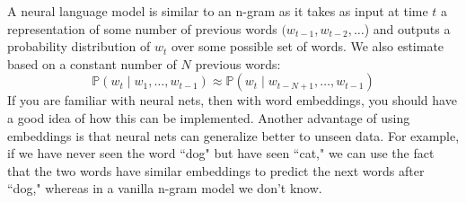 \documentclass{article}
\begin{document}
    A neural language model is similar to an n-gram as it takes as input at time $t$ a representation of some number of previous words $(w_{t-1}, w_{t-2}, \ldots$) and outputs a probability distribution of $w_t$ over some possible set of words. We also estimate based on a constant number of $N$ previous words: 
    \[\mathbb{P}(w_t \mid w_1, \ldots, w_{t-1}) \approx \mathbb{P}( w_t \mid w_{t - N + 1}, \ldots, w_{t-1})\]
    If you are familiar with neural nets, then with word embeddings, you should have a good idea of how this can be implemented. Another advantage of using embeddings is that neural nets can generalize better to unseen data. For example, if we have never seen the word ``dog" but have seen ``cat," we can use the fact that the two words have similar embeddings to predict the next words after ``dog," whereas in a vanilla n-gram model we don't know. 
\end{document}

